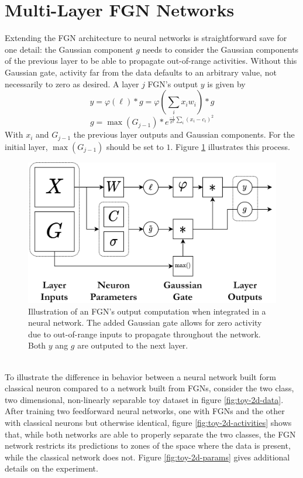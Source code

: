 \documentclass[12pt,oneside]{CUNY_PhD}
\begin{document}
\section{Multi-Layer FGN Networks}
Extending the FGN architecture to neural networks is straightforward save for one detail: the Gaussian component $g$ needs to consider the Gaussian components of the previous layer to be able to propagate out-of-range activities. Without this Gaussian gate, activity far from the data defaults to an arbitrary value, not necessarily to zero as desired. A layer $j$ FGN's output $y$ is given by
\[y =  \varphi(\ell)*g = \varphi(\sum_i x_{i} w_{i}) * g\]
\[g = \max(G_{j-1}) * e^{\frac{-1}{\sigma^2}\sum_{i}(x_i-c_i)^2}\]
With $x_{i}$ and $G_{j-1}$ the previous layer outputs and Gaussian components. For the initial layer, $\max(G_{j-1})$ should be set to $1$. Figure \ref{fig:fgn-layer} illustrates this process.
\begin{figure}[!htbp]
    \centering
        \includegraphics[width=\textwidth]{images/multi-layer-fgn/FGN-Network.png}
    \caption{Illustration of an FGN's output computation when integrated in a neural network. The added Gaussian gate allows for zero activity due to out-of-range inputs to propagate throughout the network. Both $y$ ang $g$ are outputed to the next layer.}
    \label{fig:fgn-layer}
\end{figure}\\
\indent To illustrate the difference in behavior between a neural network built form classical neuron compared to a network built from FGNs, consider the two class, two dimensional, non-linearly separable toy dataset in figure \ref{fig:toy-2d-data}. After training two feedforward neural networks, one with FGNs and the other with classical neurons but otherwise identical, figure \ref{fig:toy-2d-activities} shows that, while both networks are able to properly separate the two classes, the FGN network restricts its predictions to zones of the space where the data is present, while the classical network does not. Figure \ref{fig:toy-2d-params} gives additional details on the experiment.
\end{document}
